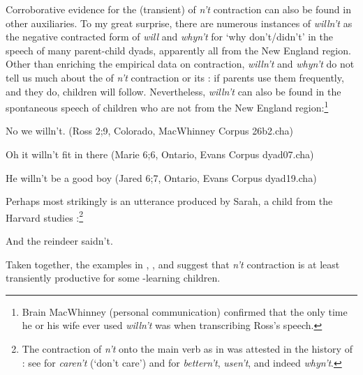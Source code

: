 \documentclass[output=paper,
modfonts
]{LSP/langsci}
\begin{document}
Corroborative  evidence for the (transient)  of \textit{n't} contraction can also be found in other auxiliaries. 
To my great
surprise, there are  numerous instances of \textit{willn't} as the negative
contracted form of \textit{will} and \textit{whyn't} for `why
  don't/didn't' in the speech of  many parent-child dyads, apparently
  all from   the New 
England region.  Other than enriching the empirical data on
contraction, \textit{willn't} and \textit{whyn't} do not tell us much about the
 of \textit{n't} contraction or its : if parents
use them frequently, and they do,  children will follow. Nevertheless,
\textit{willn't} can also be found in the spontaneous speech of children who
are not from the New England region:\footnote{Brain MacWhinney (personal
  communication) confirmed
  that the only time he or his wife ever used \textit{willn't} was  when
transcribing   Ross's speech. }

\begin{exe} \ex \label{willnt}
\begin{xlist} 
\item No we willn't. \label{rosswill} (Ross 2;9, Colorado, MacWhinney Corpus 26b2.cha)
\item Oh it willn't fit in there  (Marie 6;6, Ontario, Evans Corpus dyad07.cha)
\item He willn't be a good boy (Jared 6;7,  Ontario, Evans Corpus dyad19.cha)
\end{xlist} \end{exe}
Perhaps most strikingly is an utterance produced by Sarah, a child
from the Harvard studies \citep{Brown1973}:\footnote{The contraction of \textit{n't} onto the main verb as in  was 
attested in the history of : see \citealt{Brainerd1989} for
 \textit{  caren't} (`don't care') and \citealt{Jespersen1917} for \textit{bettern't}, \textit{usen't}, and indeed \textit{whyn't}.\label{caren't}}

\begin{exe} \ex \label{sarah}
And the reindeer saidn't. \end{exe}

\noindent Taken together, the examples in , , and
 suggest that  \textit{n't}
contraction is at least transiently productive for some -learning children. 
\end{document}
